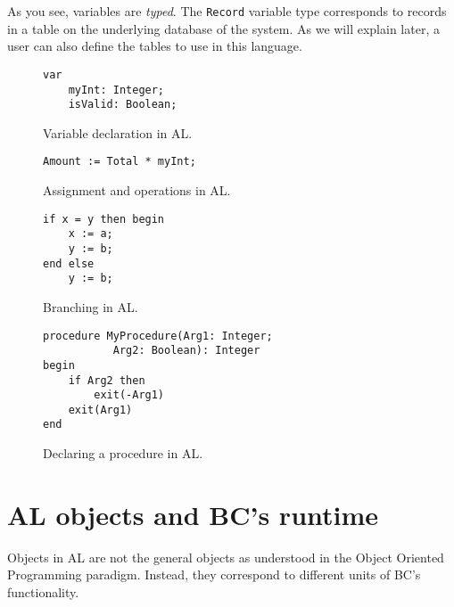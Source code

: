As you see, variables are \emph{typed}. The \texttt{Record} variable type corresponds to
records in a table on the underlying database of the system. As we will explain later,
a user can also define the tables to use in this language.

\begin{figure}
    \begin{minipage}{.45\textwidth}
        \begin{Verbatim}[fontsize=\small]
var
    myInt: Integer;
    isValid: Boolean;
        \end{Verbatim}
        \parbox{0.9\textwidth}{\caption{Variable declaration in AL.}}
        \label{fig:al-var-decl}
    \end{minipage}%
    \begin{minipage}{.45\textwidth}
        \begin{Verbatim}[fontsize=\small]
Amount := Total * myInt;
        \end{Verbatim}
        \caption{Assignment and operations in AL.}
    \end{minipage}
\end{figure}

\begin{figure}
    \begin{minipage}{.45\textwidth}
        \begin{Verbatim}[fontsize=\small]
if x = y then begin  
    x := a;  
    y := b;  
end else 
    y := b;   
        \end{Verbatim}
        \parbox{0.9\textwidth}{\caption{Branching in AL.}}
    \end{minipage}%
    \begin{minipage}{.45\textwidth}
        \begin{Verbatim}[fontsize=\small]
procedure MyProcedure(Arg1: Integer; 
           Arg2: Boolean): Integer
begin
    if Arg2 then
        exit(-Arg1)
    exit(Arg1)
end
        \end{Verbatim}
        \parbox{0.9\textwidth}{\caption{Declaring a procedure in AL.}}
        \label{fig:al-proc-decl}
    \end{minipage}%

\end{figure}

\section{AL objects and BC's runtime}
Objects in AL are not the general objects as understood in the Object Oriented Programming paradigm. Instead,
they correspond to different units of BC's functionality.

